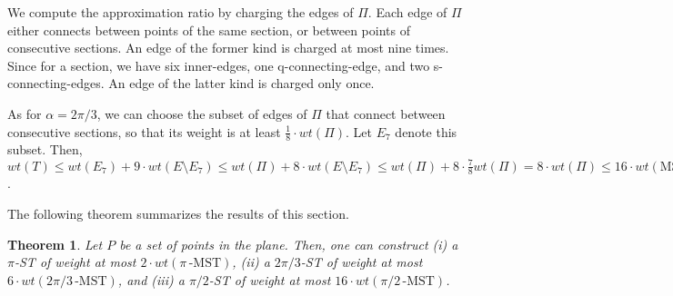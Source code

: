 \documentclass[11pt]{article}
\newtheorem{theorem}{Theorem}[section]
\begin{document}
We compute the approximation ratio by charging the edges of $\Pi$. Each edge of $\Pi$ either connects between points of the same section, or between points of consecutive sections. An edge of the former kind is charged at most nine times. Since for a section, we have six inner-edges, one q-connecting-edge, and two s-connecting-edges.
An edge of the latter kind is charged only once. 

As for $\alpha=2\pi/3$, we can choose the subset of edges of $\Pi$ that connect between consecutive sections, so that its weight is at least $\frac{1}{8} \cdot wt(\Pi)$. Let $E_7$ denote this subset. Then, 
$wt(T) \leq wt(E_7) + 9\cdot wt(E \setminus E_7) \leq wt(\Pi) + 8\cdot wt(E \setminus E_7) \leq wt(\Pi) + 8 \cdot \frac{7}{8} wt(\Pi) = 8 \cdot wt(\Pi) \leq 16\cdot wt(\mbox{MST}) \le 16 \cdot wt(\pi/2\!\,\mbox{-MST})$.
 
The following theorem summarizes the results of this section.
\begin{theorem}
Let $P$ be a set of points in the plane. Then, one can construct (i) a $\pi$-ST
of weight at most $2 \cdot wt(\pi\!\,\mbox{-MST})$, (ii) a $2\pi/3$-ST of weight at most $6 \cdot wt(2\pi/3\!\,\mbox{-MST})$, and
(iii) a $\pi/2$-ST of weight at most $16 \cdot wt(\pi/2\!\,\mbox{-MST})$.
\end{theorem}
\end{document}
